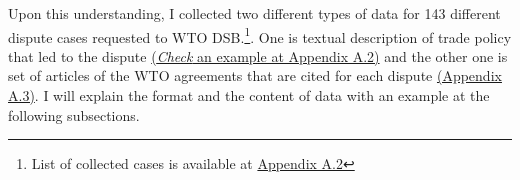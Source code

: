 \noindent Upon this understanding, 
I collected two different types of data for 143 different dispute cases requested to WTO DSB.\footnote{List of collected cases is
    available at \hyperref[sub:cited-articles-table]{Appendix A.2}
}.
One is textual description of trade policy
that led to the dispute \hyperref[sub:factual-aspect-example]{(\textit{Check} an example at Appendix A.2)} and the other one is
set of articles of the WTO agreements that are
cited for each dispute \hyperref[sub:cited-articles-table]{(Appendix A.3)}.
I will explain the format and the content of
data with an example at the following subsections.













